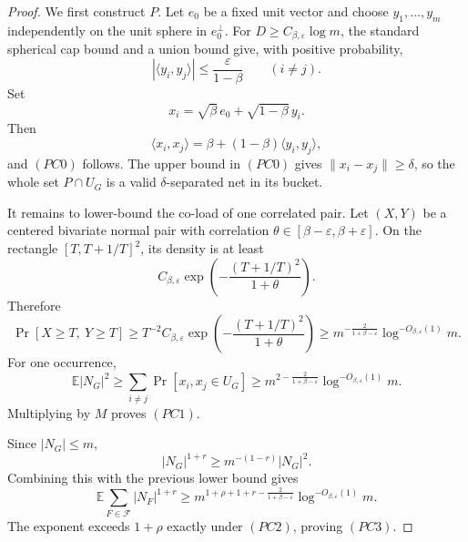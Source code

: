 \documentclass[10pt]{article}
\theoremstyle{definition}
\newcommand{\E}{\mathbb{E}}
\newcommand{\ip}[2]{\langle #1,#2\rangle}
\begin{document}
\begin{proof}
   We first construct \(P\).  Let \(e_0\) be a fixed unit vector and choose
   \(y_1,\ldots,y_m\) independently on the unit sphere in \(e_0^\perp\).  For
   \(D\ge C_{\beta,\varepsilon}\log m\), the standard spherical cap bound and
   a union bound give, with positive probability,
   \[
      |\ip{y_i}{y_j}|\le \frac{\varepsilon}{1-\beta}
      \qquad(i\ne j).
   \]
   Set
   \[
      x_i=\sqrt{\beta}\,e_0+\sqrt{1-\beta}\,y_i .
   \]
   Then
   \[
      \ip{x_i}{x_j}
      =
      \beta+(1-\beta)\ip{y_i}{y_j},
   \]
   and \((PC0)\) follows.  The upper bound in \((PC0)\) gives
   \(\|x_i-x_j\|\ge\delta\), so the whole set \(P\cap U_G\) is a valid
   \(\delta\)-separated net in its bucket.

   It remains to lower-bound the co-load of one correlated pair.  Let
   \((X,Y)\) be a centered bivariate normal pair with correlation
   \(\theta\in[\beta-\varepsilon,\beta+\varepsilon]\).  On the rectangle
   \([T,T+1/T]^2\), its density is at least
   \[
      C_{\beta,\varepsilon}
      \exp\!\left(-\frac{(T+1/T)^2}{1+\theta}\right).
   \]
   Therefore
   \[
      \Pr[X\ge T,\ Y\ge T]
      \ge
      T^{-2}C_{\beta,\varepsilon}
      \exp\!\left(-\frac{(T+1/T)^2}{1+\theta}\right)
      \ge
      m^{-\frac{2}{1+\beta-\varepsilon}}
      \log^{-O_{\beta,\varepsilon}(1)}m .
      \tag{PC4}
   \]
   For one occurrence,
   \[
      \E |N_G|^2
      \ge
      \sum_{i\ne j}\Pr[x_i,x_j\in U_G]
      \ge
      m^{2-\frac{2}{1+\beta-\varepsilon}}
      \log^{-O_{\beta,\varepsilon}(1)}m .
   \]
   Multiplying by \(M\) proves \((PC1)\).

   Since \(|N_G|\le m\),
   \[
      |N_G|^{1+r}\ge m^{-(1-r)}|N_G|^2 .
   \]
   Combining this with the previous lower bound gives
   \[
      \E\sum_{F\in\mathcal F}|N_F|^{1+r}
      \ge
      m^{1+\rho+1+r-\frac{2}{1+\beta-\varepsilon}}
      \log^{-O_{\beta,\varepsilon}(1)}m .
   \]
   The exponent exceeds \(1+\rho\) exactly under \((PC2)\), proving
   \((PC3)\).
\end{proof}
\end{document}
